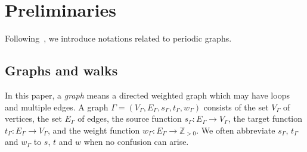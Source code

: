 \section{Preliminaries}\label{section:pre}

Following~\cite{IN}, we introduce notations related to periodic graphs.

\subsection{Graphs and walks}

In this paper, a \textit{graph} means a directed weighted graph which may have loops and multiple edges. 
A graph $\Gamma = (V_{\Gamma}, E_{\Gamma}, s_{\Gamma}, t_{\Gamma}, w_{\Gamma})$ 
consists of the set $V_{\Gamma}$ of vertices, the set $E_{\Gamma}$ of edges, 
the source function $s_{\Gamma}: E_{\Gamma} \to V_{\Gamma}$, 
the target function $t_{\Gamma}: E_{\Gamma} \to V_{\Gamma}$, and 
the weight function $w_{\Gamma}: E_{\Gamma} \to \mathbb{Z}_{> 0}$. 
We often abbreviate $s_{\Gamma}$, $t_{\Gamma}$ and $w_{\Gamma}$ to $s$, $t$ and $w$ 
when no confusion can arise. 

